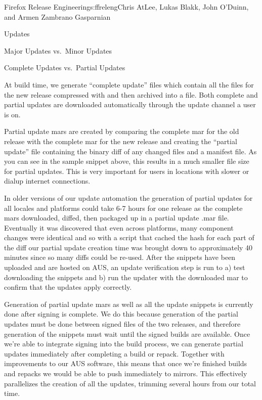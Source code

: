 \begin{aosachapter}{Firefox Release Engineering}{s:ffreleng}{Chris AtLee, Lukas Blakk, John O'Duinn, and Armen Zambrano Gasparnian}
\begin{aosasect1}{Updates}
\begin{aosasect2}{Major Updates vs.\ Minor Updates}
\end{aosasect2}

\begin{aosasect2}{Complete Updates vs.\ Partial Updates}

At build time, we generate ``complete update''  files which
contain all the files for the new release compressed with 
and then archived into a  file. Both complete and partial
updates are downloaded automatically through the update channel a user
is on.

Partial update mars are created by comparing the complete mar for the
old release with the complete mar for the new release and creating the
``partial update''  file containing the binary diff of any
changed files and a manifest file. As you can see in the sample
snippet above, this results in a much smaller file size for partial
updates. This is very important for users in locations with slower or
dialup internet connections.

In older versions of our update automation the generation of partial
updates for all locales and platforms could take 6-7 hours for one
release as the complete mars downloaded, diffed, then packaged up in a
partial update .mar file. Eventually it was discovered that even
across platforms, many component changes were identical and so with a
script that cached the hash for each part of the diff our partial
update creation time was brought down to approximately 40 minutes
since so many diffs could be re-used. After the snippets have been
uploaded and are hosted on AUS, an update verification step is run to
a) test downloading the snippets and b) run the updater with the
downloaded mar to confirm that the updates apply correctly.

Generation of partial update mars as well as all the update snippets
is currently done after signing is complete. We do this because
generation of the partial updates must be done between signed files of
the two releases, and therefore generation of the snippets must wait
until the signed builds are available.  Once we're able to integrate
signing into the build process, we can generate partial updates
immediately after completing a build or repack. Together with
improvements to our AUS software, this means that once we're finished
builds and repacks we would be able to push immediately to
mirrors. This effectively parallelizes the creation of all the
updates, trimming several hours from our total time.
  
\end{aosasect2}


\end{aosasect1}
\end{aosachapter}
